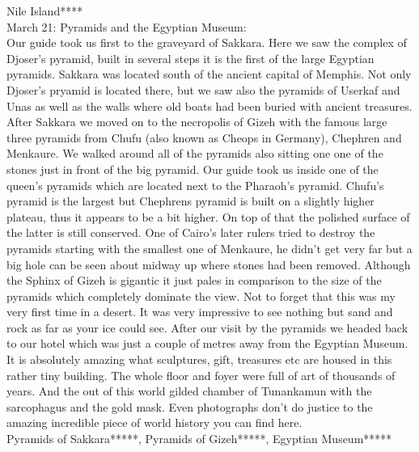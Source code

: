 Nile Island****\\

March 21: Pyramids and the Egyptian Museum:\\
Our guide took us first to the graveyard of Sakkara. Here we saw the complex of Djoser's pyramid, built in several steps it is the first of the large Egyptian pyramids. Sakkara was located south of the ancient capital of Memphis. Not only Djoser's pryamid is located there, but we saw also the pyramids of Userkaf and Unas as well as the walls where old boats had been buried with ancient treasures. After Sakkara we moved on to the necropolis of Gizeh with the famous large three pyramids from Chufu (also known as Cheops in Germany), Chephren and Menkaure. We walked around all of the pyramids also sitting one one of the stones just in front of the big pyramid. Our guide took us inside one of the queen's pyramids which are located next to the Pharaoh's pyramid. Chufu's pyramid is the largest but Chephrens pyramid is built on a slightly higher plateau, thus it appears to be a bit higher. On top of that the polished surface of the latter is still conserved. One of Cairo's later rulers tried to destroy the pyramids starting with the smallest one of Menkaure, he didn't get very far but a big hole can be seen about midway up where stones had been removed. Although the Sphinx of Gizeh is gigantic it just pales in comparison to the size of the pyramids which completely dominate the view. Not to forget that this was my very first time in a desert. It was very impressive to see nothing but sand and rock as far as your ice could see. After our visit by the pyramids we headed back to our hotel which was just a couple of metres away from the Egyptian Museum. It is absolutely amazing what sculptures, gift, treasures etc are housed in this rather tiny building. The whole floor and foyer were full of art of thousands of years. And the out of this world gilded chamber of Tunankamun with the sarcophagus and the gold mask. Even photographs don't do justice to the amazing incredible piece of world history you can find here.\\

Pyramids of Sakkara*****, Pyramids of Gizeh*****, Egyptian Museum*****\\

